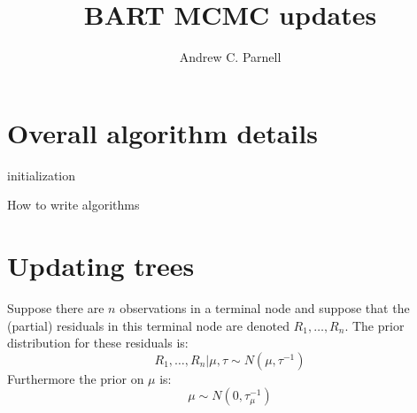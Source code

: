\documentclass{article}
\begin{document}
\title{BART MCMC updates}
\author{Andrew C. Parnell}
\maketitle


\section*{Overall algorithm details}

\begin{algorithm}[H]
 initialization\;
 \caption{How to write algorithms}
\end{algorithm}

\section{Updating trees}

Suppose there are $n$ observations in a terminal node and suppose that the (partial) residuals in this terminal node are denoted $R_1, \ldots, R_n$. The prior distribution for these residuals is:
$$ R_1, \ldots, R_n | \mu, \tau \sim N(\mu, \tau^{-1})$$
Furthermore the prior on $\mu$ is:
$$\mu \sim N(0, \tau_{\mu}^{-1})$$
\end{document}
